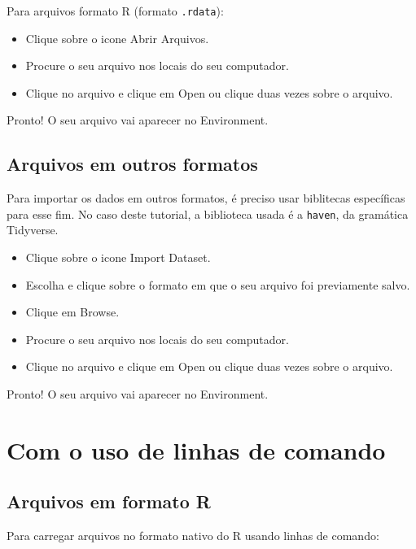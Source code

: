 \documentclass[
  brazil,
]{book}
\providecommand{\tightlist}{%
  \setlength{\itemsep}{0pt}\setlength{\parskip}{0pt}}
\begin{document}
Para arquivos formato R (formato \texttt{.rdata}):

\begin{itemize}
\tightlist
\item
  Clique sobre o icone Abrir Arquivos.
\item
  Procure o seu arquivo nos locais do seu computador.
\item
  Clique no arquivo e clique em Open ou clique duas vezes sobre o arquivo.
\end{itemize}

Pronto! O seu arquivo vai aparecer no Environment.

\hypertarget{arquivos-em-outros-formatos}{%
\subsection{Arquivos em outros formatos}\label{arquivos-em-outros-formatos}}

Para importar os dados em outros formatos, é preciso usar biblitecas específicas para esse fim. No caso deste tutorial, a biblioteca usada é a \texttt{haven}, da gramática Tidyverse.

\begin{itemize}
\tightlist
\item
  Clique sobre o icone Import Dataset.
\item
  Escolha e clique sobre o formato em que o seu arquivo foi previamente salvo.
\item
  Clique em Browse.
\item
  Procure o seu arquivo nos locais do seu computador.
\item
  Clique no arquivo e clique em Open ou clique duas vezes sobre o arquivo.
\end{itemize}

Pronto! O seu arquivo vai aparecer no Environment.

\hypertarget{com-o-uso-de-linhas-de-comando}{%
\section{Com o uso de linhas de comando}\label{com-o-uso-de-linhas-de-comando}}

\hypertarget{arquivos-em-formato-r-1}{%
\subsection{Arquivos em formato R}\label{arquivos-em-formato-r-1}}

Para carregar arquivos no formato nativo do R usando linhas de comando:
\end{document}
